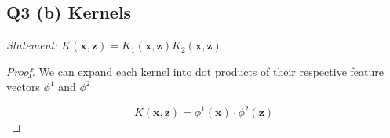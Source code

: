 \documentclass[11pt]{amsart}
\newcommand{\vek}[1]{\mathbf{#1}}
\begin{document}
\subsection{Q3 (b) Kernels}

{\it Statement: } $K(\vek{x}, \vek{z}) = K_1(\vek{x}, \vek{z})K_2(\vek{x}, \vek{z})$

\begin{proof}

We can expand each kernel into dot products of their respective feature vectors $\phi^{1}$ and $\phi^{2}$

\begin{equation}
K(\vek{x}, \vek{z}) = \phi^1(\vek{x}) \cdot \phi^2(\vek{z})
\end{equation}

\end{proof}



\end{document}
